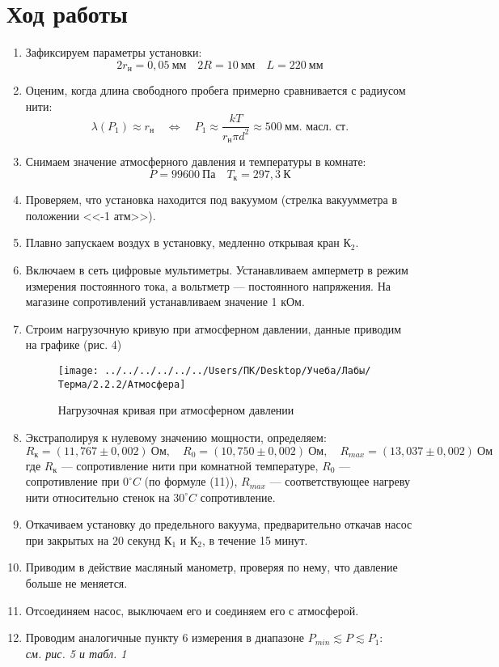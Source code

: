 \documentclass[12pt,a4paper]{article}
\begin{document}
\section{Ход работы}
	\begin{enumerate}
		\item Зафиксируем параметры установки: $$2r_\text{н} = 0,05~\text{мм}\quad 2R = 10~\text{мм} \quad L = 220~\text{мм}$$
		\item Оценим, когда длина свободного пробега примерно сравнивается с радиусом нити: $$
		\lambda (P_1) \approx r_\text{н} \quad
		\Leftrightarrow \quad
		P_1 \approx \frac{kT}{r_\text{н}\pi d^2} \approx 500~\text{мм. масл. ст.}
		$$
		\item Снимаем значение атмосферного давления и температуры в комнате: $$P = 99600~\text{Па} \quad T_\text{к} = 297,3 ~\text{К}$$
		\item Проверяем, что установка находится под вакуумом (стрелка вакуумметра в положении <<-1 атм>>).
		\item Плавно запускаем воздух в установку, медленно открывая кран К$_2$.
		\item Включаем в сеть цифровые мультиметры. Устанавливаем амперметр в режим измерения постоянного тока, а вольтметр — постоянного напряжения. На магазине сопротивлений устанавливаем значение 1 кОм.
		\item Строим нагрузочную кривую при атмосферном давлении, данные приводим на графике (рис. 4)
		\begin{figure}[h!]
			\centering
			\texttt{[image: ../../../../../../Users/ПК/Desktop/Учеба/Лабы/Терма/2.2.2/Атмосфера]}
			\caption{Нагрузочная кривая при атмосферном давлении}
			\label{fig:}
		\end{figure}
		\item Экстраполируя к нулевому значению мощности, определяем: 
		$$R_\text{к} = (11, 767 \pm 0,002) ~\text{Ом}, \quad R_0 = (10,750 \pm 0,002) ~\text{Ом},\quad R_{max} = (13,037 \pm 0,002) ~\text{Ом}$$
		где $R_\text{к}$ --- сопротивление нити при комнатной температуре, $R_0$ --- сопротивление при $0 ^\circ C$ (по формуле (11)), $R_{max}$ --- соответствующее нагреву нити относительно стенок на $30 ^\circ C$ сопротивление.
		\item Откачиваем установку до предельного вакуума, предварительно откачав насос при закрытых на 20 секунд К$_1$ и К$_2$, в течение 15 минут.
		\item Приводим в действие масляный манометр, проверяя по нему, что давление больше не меняется.
		\item Отсоединяем насос, выключаем его и соединяем его с атмосферой.
		\item Проводим аналогичные пункту 6 измерения в диапазоне $P_{min} \lesssim P \lesssim P_1$: \\
		\emph{см. рис. 5 и табл. 1}
		

\end{enumerate}
\end{document}
